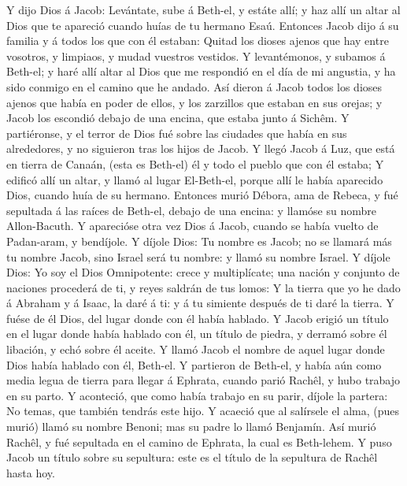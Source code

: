  Y dijo Dios á Jacob: Levántate, sube á Beth-el, y estáte
allí; y haz allí un altar al Dios que te apareció cuando huías de tu
hermano Esaú.  Entonces Jacob dijo á su familia y á todos
los que con él estaban: Quitad los dioses ajenos que hay entre vosotros,
y limpiaos, y mudad vuestros vestidos.  Y levantémonos, y
subamos á Beth-el; y haré allí altar al Dios que me respondió en el día
de mi angustia, y ha sido conmigo en el camino que he andado.
 Así dieron á Jacob todos los dioses ajenos que había en
poder de ellos, y los zarzillos que estaban en sus orejas; y Jacob los
escondió debajo de una encina, que estaba junto á Sichêm.  Y
partiéronse, y el terror de Dios fué sobre las ciudades que había en sus
alrededores, y no siguieron tras los hijos de Jacob.  Y
llegó Jacob á Luz, que está en tierra de Canaán, (esta es Beth-el) él y
todo el pueblo que con él estaba;  Y edificó allí un altar,
y llamó al lugar El-Beth-el, porque allí le había aparecido Dios, cuando
huía de su hermano.  Entonces murió Débora, ama de Rebeca, y
fué sepultada á las raíces de Beth-el, debajo de una encina: y llamóse
su nombre Allon-Bacuth.  Y aparecióse otra vez Dios á Jacob,
cuando se había vuelto de Padan-aram, y bendíjole.  Y
díjole Dios: Tu nombre es Jacob; no se llamará más tu nombre Jacob, sino
Israel será tu nombre: y llamó su nombre Israel.  Y díjole
Dios: Yo soy el Dios Omnipotente: crece y multiplícate; una nación y
conjunto de naciones procederá de ti, y reyes saldrán de tus lomos:
 Y la tierra que yo he dado á Abraham y á Isaac, la daré á
ti: y á tu simiente después de ti daré la tierra.  Y fuése
de él Dios, del lugar donde con él había hablado.  Y Jacob
erigió un título en el lugar donde había hablado con él, un título de
piedra, y derramó sobre él libación, y echó sobre él aceite.
 Y llamó Jacob el nombre de aquel lugar donde Dios había
hablado con él, Beth-el.  Y partieron de Beth-el, y había
aún como media legua de tierra para llegar á Ephrata, cuando parió
Rachêl, y hubo trabajo en su parto.  Y aconteció, que como
había trabajo en su parir, díjole la partera: No temas, que también
tendrás este hijo.  Y acaeció que al salírsele el alma,
(pues murió) llamó su nombre Benoni; mas su padre lo llamó Benjamín.
 Así murió Rachêl, y fué sepultada en el camino de Ephrata,
la cual es Beth-lehem.  Y puso Jacob un título sobre su
sepultura: este es el título de la sepultura de Rachêl hasta hoy.
